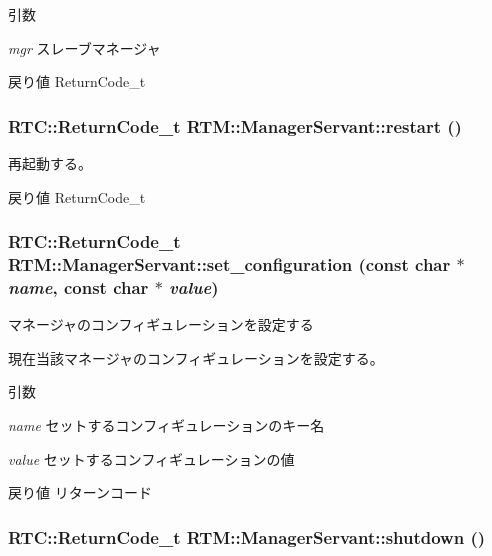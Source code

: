 \begin{DoxyParams}{引数}
\item[{\em mgr}]スレーブマネージャ \end{DoxyParams}
\begin{DoxyReturn}{戻り値}
ReturnCode\_\-t 
\end{DoxyReturn}
\subsubsection[{restart}]{\setlength{\rightskip}{0pt plus 5cm}RTC::ReturnCode\_\-t RTM::ManagerServant::restart ()}\label{classRTM_1_1ManagerServant_aad40967cb7c29e2466c8dde7e2dad25f}


再起動する。 

\begin{DoxyReturn}{戻り値}
ReturnCode\_\-t 
\end{DoxyReturn}
\subsubsection[{set\_\-configuration}]{\setlength{\rightskip}{0pt plus 5cm}RTC::ReturnCode\_\-t RTM::ManagerServant::set\_\-configuration (const char $\ast$ {\em name}, \/  const char $\ast$ {\em value})}\label{classRTM_1_1ManagerServant_a085a32d8ad1124a277d10c50e3bc99d9}


マネージャのコンフィギュレーションを設定する 

現在当該マネージャのコンフィギュレーションを設定する。


\begin{DoxyParams}{引数}
\item[{\em name}]セットするコンフィギュレーションのキー名 \item[{\em value}]セットするコンフィギュレーションの値 \end{DoxyParams}
\begin{DoxyReturn}{戻り値}
リターンコード 
\end{DoxyReturn}
\subsubsection[{shutdown}]{\setlength{\rightskip}{0pt plus 5cm}RTC::ReturnCode\_\-t RTM::ManagerServant::shutdown ()}\label{classRTM_1_1ManagerServant_a98f5d973b85551ddc88094c34a3df1c7}


